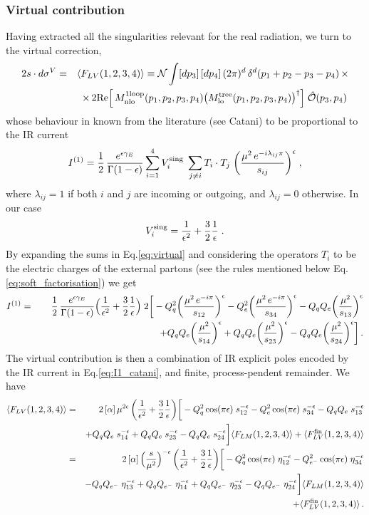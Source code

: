 \documentclass[12pt,a4paper]{article}
\newcommand{\nn}{\nonumber}
\newcommand{\eps}{\epsilon}
\newcommand{\beq}{\begin{eqnarray}}
\newcommand{\eeq}{\end{eqnarray}}
\begin{document}
\subsubsection{Virtual contribution}
\label{subsec:V_NLO_QED}
Having extracted all the singularities relevant for the real radiation, we turn to the virtual correction, 
\beq
2s\cdot d\sigma^{V} &=&
 \langle F_{LV} (1,2,3,4) \rangle
\equiv 
\mathcal{N} \int [dp_3] \, [dp_4] \,(2\pi)^{d} \, \delta^d(p_1+p_2-p_3-p_4) \, \times
\nn \\
&&
\times \, 2 {\rm Re} \Big[
\, M_{\rm nlo}^{\rm 1loop}(p_1,p_2,p_3,p_4)
 \big(M_{\rm lo}^{\rm tree}(p_1,p_2,p_3,p_4)\big)^{\dagger}
\Big] \;
\hat{\mathcal{O}}(p_3, p_4) \, 
\eeq
whose behaviour in known from the literature (see Catani) to be proportional to the IR current
\beq
I^{(1)}= \frac12  \, \frac{e^{\eps \gamma_E}}{\Gamma(1-\eps)}
\sum_{i=1}^4 V_i^{\rm sing} \; \sum_{j\neq i} T_i \cdot T_j \; 
\bigg( 
\frac{\mu^2 \, e^{-i \lambda_{ij} \pi}}{s_{ij}}\bigg)^\eps \; ,
\label{eq:virtual}
\eeq
where $\lambda_{ij}= 1$ if both $i$ and $j$ are incoming or outgoing, and $\lambda_{ij}= 0$ otherwise. In our case
\beq
V_i^{\rm sing} = \frac1{\eps^2}+\frac32 \frac1\eps \; .
\eeq
By expanding the sums in Eq.\eqref{eq:virtual} and considering the operators $T_i$ to be the electric charges of the external partons (see the rules mentioned below Eq.\eqref{eq:soft_factorisation}) we get
\beq
I^{(1)} &=&
 \frac12  \, \frac{e^{\eps \gamma_E}}{\Gamma(1-\eps)}
\Big( \frac1{\eps^2}+\frac32 \frac1\eps 
\Big) \; 
2 
\bigg[ 
- Q^2_q \bigg(\frac{\mu^2 \, e^{-i \pi}}{s_{12}}\bigg)^\eps
- Q^2_{e} \bigg(\frac{\mu^2 \, e^{-i \pi}}{s_{34}}\bigg)^\eps
- Q_q Q_{e} \bigg(\frac{\mu^2}{s_{13}}\bigg)^\eps
\nn \\
&& 
\hspace{45mm}
+ Q_q Q_{e}  \bigg(\frac{\mu^2}{s_{14}}\bigg)^\eps
+ Q_{q}Q_{e} \bigg(\frac{\mu^2}{s_{23}}\bigg)^\eps
- Q_{q} Q_{e} \bigg(\frac{\mu^2}{s_{24}}\bigg)^\eps
\bigg] \, .
\label{eq:I1_catani}
\nn
\eeq
The virtual contribution is then a combination of IR explicit poles encoded by the IR current in Eq.\eqref{eq:I1_catani}, and finite, process-pendent remainder. We have
\beq
\langle F_{LV}(1,2,3,4) \rangle
&=&
2 \, [\alpha]\, \mu^{2\eps}\, \bigg( \frac1{\eps^{2}}+\frac32 \frac1\eps\bigg)
\bigg[
- Q^2_q  \cos(\pi \eps)\; s_{12}^{-\eps}
- Q_{e}^2  \cos(\pi \eps)\; s_{34}^{-\eps}
- Q_q Q_{e} \; s_{13}^{-\eps}
\nn \\
&& 
+ Q_q Q_{e} \; s_{14}^{-\eps}
+ Q_q Q_{e} \; s_{23}^{-\eps}
- Q_q Q_{e} \; s_{24}^{-\eps}
\bigg] \langle F_{LM} (1,2,3,4) \rangle
+\langle F_{LV}^{\rm fin} (1,2,3,4) \rangle
\nn \\
&=&
2 \, [\alpha]\, \Big(\frac{s}{\mu^2} \Big)^{-\eps}  \, \bigg( \frac1{\eps^{2}}+\frac32 \frac1\eps\bigg)
\bigg[
- Q^2_q \cos(\pi \eps)\; \eta_{12}^{-\eps}
- Q^2_{e^-}  \cos(\pi \eps)\; \eta_{34}^{-\eps}
\nn \\
&& 
- Q_q Q_{e^-} \; \eta_{13}^{-\eps}
+ Q_q Q_{e^-}  \; \eta_{14}^{-\eps}
+ Q_{q}Q_{e^-} \; \eta_{23}^{-\eps}
- Q_{q} Q_{e^-}  \; \eta_{24}^{-\eps}
\bigg] \langle F_{LM} (1,2,3,4) \rangle
\nn \\
&&
+\langle F_{LV}^{\rm fin} (1,2,3,4) \rangle \, .
\label{eq:virtual_QED_NLO}
\eeq
\end{document}
